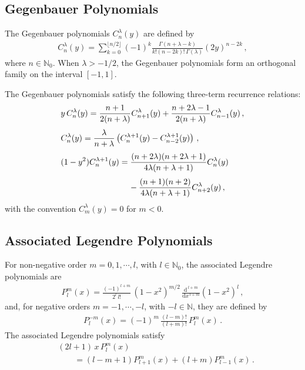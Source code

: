 \documentclass[aps,twocolumn,nofootinbib]{revtex4}
\begin{document}
{\begin{appendix}
\subsection{Gegenbauer Polynomials}\label{A-Ge-pol}

The Gegenbauer polynomials $C_n^\lambda(y)$ are defined by
\begin{align}
    C_n^\lambda(y) = \sum_{k=0}^{\lfloor n/2 \rfloor} (-1)^k \frac{\Gamma(n + \lambda - k)}{k! (n - 2k)!\, \Gamma(\lambda)} (2y)^{n-2k}\,,
\end{align}
where $n\in\mathbb N_0$. When $\lambda>-1/2$, the Gegenbauer polynomials form an orthogonal family on the interval $[-1,1]$. 

The Gegenbauer polynomials satisfy the following three-term recurrence relations:
\begin{align}
    &y\, C_n^\lambda(y) = \frac{n+1}{2(n+\lambda)} C_{n+1}^\lambda(y) + \frac{n+2\lambda-1}{2(n+\lambda)} C_{n-1}^\lambda(y)\,, \label{sec2-321}\\[3pt]
    &C_n^\lambda(y) = \frac{\lambda}{n+\lambda} \left( C_n^{\lambda+1}(y) - C_{n-2}^{\lambda+1}(y) \right)\,, \label{sec2-ne} \\[3pt]
    &(1-y^2) C_n^{\lambda+1}(y) = \frac{(n+2\lambda)(n+2\lambda+1)}{4\lambda(n+\lambda+1)} C_n^\lambda(y) \nonumber\\[3pt]
    &\hspace{2.9cm} - \frac{(n+1)(n+2)}{4\lambda(n+\lambda+1)} C_{n+2}^\lambda(y) \,, \label{miriamTR}
\end{align}
with the convention $C_m^\lambda(y) = 0$ for $m<0$.


\subsection{Associated Legendre Polynomials}\label{Sec. Ass. Legen. Pol.}

For non-negative order $m=0,1,\cdots,l$, with $l\in\mathbb N_0$, the associated Legendre polynomials are
\begin{align}
    P_l^m(x) = \frac{(-1)^{l+m}}{2^l \, l!} \,(1-x^2)^{m/2}\,  \frac{\mathrm{d}^{\,l+m}}{\mathrm{d}x^{\,l+m}} (1-x^2)^l \,,
\end{align}
and, for negative orders $m=-1,\cdots,-l$, with $-l\in\mathbb N$, they are defined by
\begin{align}
    P_l^{-m}(x) = (-1)^m \,\frac{(l-m)!}{(l+m)!} \,P_l^m(x) \,.
\end{align}
The associated Legendre polynomials satisfy
\begin{align} \label{legendre-recurrence}
    &(2l+1)\,x\, P_l^m(x) \nonumber\\[3pt]
    &\qquad = (l-m+1)P_{l+1}^m(x) + (l+m)P_{l-1}^m(x) \,.
\end{align}



\end{appendix}}
\end{document}
